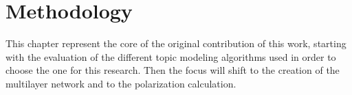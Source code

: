 \chapter{Methodology}
\label{ch:methodology}
This chapter represent the core of the original contribution of this work, starting with the evaluation of the different topic modeling algorithms used in order to choose the one for this research. Then the focus will shift to the creation of the multilayer network and to the polarization calculation.


